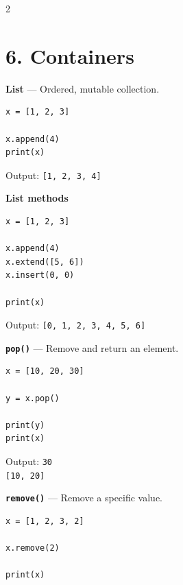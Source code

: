 \documentclass[10pt,a4paper]{article}
\begin{document}
\begin{multicols}{2}
\raggedcolumns

\section*{6. Containers}

\begin{card}
\textbf{List} --- Ordered, mutable collection.

\begin{lstlisting}[style=pythonstyle]
x = [1, 2, 3]

x.append(4)
print(x)
\end{lstlisting}

Output:
\texttt{[1, 2, 3, 4]}
\end{card}

\begin{card}
\textbf{List methods}

\begin{lstlisting}[style=pythonstyle]
x = [1, 2, 3]

x.append(4)
x.extend([5, 6])
x.insert(0, 0)

print(x)
\end{lstlisting}

Output:
\texttt{[0, 1, 2, 3, 4, 5, 6]}
\end{card}

\begin{card}
\textbf{\texttt{pop()}} --- Remove and return an element.

\begin{lstlisting}[style=pythonstyle]
x = [10, 20, 30]

y = x.pop()

print(y)
print(x)
\end{lstlisting}

Output:
\texttt{30}\\
\texttt{[10, 20]}
\end{card}

\begin{card}
\textbf{\texttt{remove()}} --- Remove a specific value.

\begin{lstlisting}[style=pythonstyle]
x = [1, 2, 3, 2]

x.remove(2)

print(x)
\end{lstlisting}


\end{card}
\end{multicols}
\end{document}
